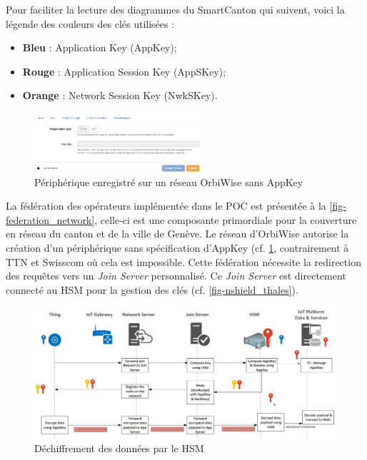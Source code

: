 Pour faciliter la lecture des diagrammes du SmartCanton qui suivent, voici la légende des couleurs des clés utilisées : 
\begin{itemize}
    \item \textcolor[rgb]{0,0,1}{\textbf{Bleu}} : Application Key (AppKey);
    \item \textcolor[rgb]{1,0,0}{\textbf{Rouge}} : Application Session Key (AppSKey);
    \item \textcolor[rgb]{1,0.8,0}{\textbf{Orange}} : Network Session Key (NwkSKey).\\
\end{itemize}

\begin{figure}[ht!]
    \centering
    \includegraphics[width=0.55\textwidth]{Figures/Security/smartcanton/orbiwise_no_appkey.png}
    \caption{Périphérique enregistré sur un réseau OrbiWise sans AppKey}
    \label{fig-orbiwise_no_appkey}
\end{figure}

La fédération des opérateurs implémentée dans le POC est présentée à la \cref{fig-federation_network}, celle-ci est une composante primordiale pour la couverture en réseau du canton et de la ville de Genève. Le réseau d'OrbiWise autorise la création d'un périphérique sans spécification d'AppKey (cf. \cref{fig-orbiwise_no_appkey}, contrairement à TTN et Swisscom où cela est impossible. Cette fédération nécessite la redirection des requêtes vers un \textit{Join Server} personnalisé. Ce \textit{Join Server} est directement connecté au HSM pour la gestion des clés (cf. \cref{fig-nshield_thales}).\\


\begin{figure}[ht!]
    \centering
    \includegraphics[width=1.0\textwidth]{Figures/Security/smartcanton/smartcanton_joinserver_decrypt_hsm.png}
    \caption{Déchiffrement des données par le HSM}
    \label{fig-smartcanton_joinserver_decrypt_hsm}
\end{figure}


